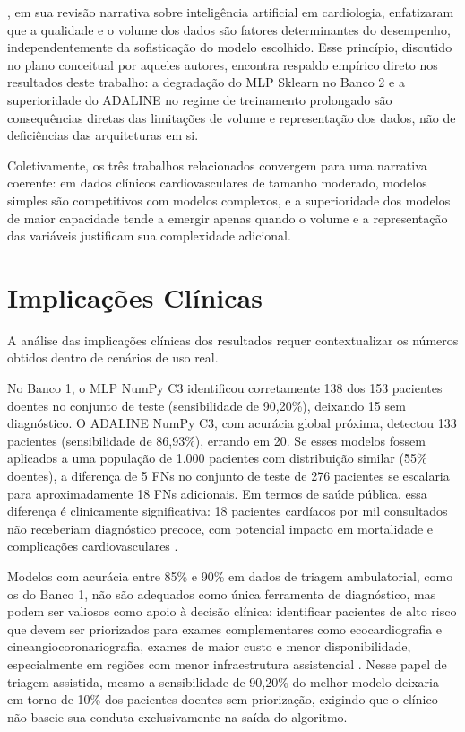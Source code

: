 , em sua revis\~ao narrativa sobre intelig\^encia artificial em cardiologia, enfatizaram que a qualidade e o volume dos dados s\~ao fatores determinantes do desempenho, independentemente da sofistica\c c\~ao do modelo escolhido. Esse princ\'ipio, discutido no plano conceitual por aqueles autores, encontra respaldo emp\'irico direto nos resultados deste trabalho: a degrada\c c\~ao do MLP Sklearn no Banco 2 e a superioridade do ADALINE no regime de treinamento prolongado s\~ao consequ\^encias diretas das limita\c c\~oes de volume e representa\c c\~ao dos dados, n\~ao de defici\^encias das arquiteturas em si.

Coletivamente, os tr\^es trabalhos relacionados convergem para uma narrativa coerente: em dados cl\'inicos cardiovasculares de tamanho moderado, modelos simples s\~ao competitivos com modelos complexos, e a superioridade dos modelos de maior capacidade tende a emergir apenas quando o volume e a representa\c c\~ao das vari\'aveis justificam sua complexidade adicional.

\section{Implica\c c\~oes Cl\'inicas}
\label{sec:implicacoes_clinicas}

A an\'alise das implica\c c\~oes cl\'inicas dos resultados requer contextualizar os n\'umeros obtidos dentro de cen\'arios de uso real.

No Banco 1, o MLP NumPy C3 identificou corretamente 138 dos 153 pacientes doentes no conjunto de teste (sensibilidade de 90,20\%), deixando 15 sem diagn\'ostico. O ADALINE NumPy C3, com acur\'acia global pr\'oxima, detectou 133 pacientes (sensibilidade de 86,93\%), errando em 20. Se esses modelos fossem aplicados a uma popula\c c\~ao de 1.000 pacientes com distribui\c c\~ao similar (\~55\% doentes), a diferen\c ca de 5 FNs no conjunto de teste de 276 pacientes se escalaria para aproximadamente 18 FNs adicionais. Em termos de sa\'ude p\'ublica, essa diferen\c ca \'e clinicamente significativa: 18 pacientes card\'iacos por mil consultados n\~ao receberiam diagn\'ostico precoce, com potencial impacto em mortalidade e complica\c c\~oes cardiovasculares \cite{porto2019}.

Modelos com acur\'acia entre 85\% e 90\% em dados de triagem ambulatorial, como os do Banco 1, n\~ao s\~ao adequados como \'unica ferramenta de diagn\'ostico, mas podem ser valiosos como apoio \`a decis\~ao cl\'inica: identificar pacientes de alto risco que devem ser priorizados para exames complementares como ecocardiografia e cineangiocoronariografia, exames de maior custo e menor disponibilidade, especialmente em regi\~oes com menor infraestrutura assistencial \cite{brandao2025}. Nesse papel de triagem assistida, mesmo a sensibilidade de 90,20\% do melhor modelo deixaria em torno de 10\% dos pacientes doentes sem prioriza\c c\~ao, exigindo que o cl\'inico n\~ao baseie sua conduta exclusivamente na sa\'ida do algoritmo.


